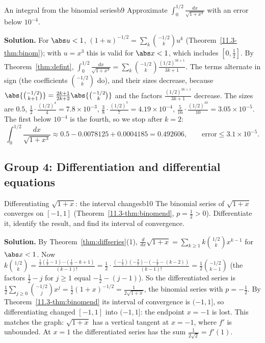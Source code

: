 \documentclass[11pt]{article}
\begin{document}
\begin{exmp}{An integral from the binomial series}{b9}
Approximate $\displaystyle\int_0^{1/2}\frac{dx}{\sqrt{1+x^3}}$ with an error below $10^{-4}$.

\textbf{Solution.} For $\abs u<1$, $(1+u)^{-1/2}=\sum_k\binom{-1/2}ku^k$ (Theorem~\ref{11.3-thm:binom}); with $u=x^3$ this is valid for $\abs x<1$, which includes $[0,\frac12]$. By Theorem~\ref{thm:defint}, $\int_0^{1/2}\frac{dx}{\sqrt{1+x^3}}=\sum_k\binom{-1/2}k\frac{(1/2)^{3k+1}}{3k+1}$. The terms alternate in sign (the coefficients $\binom{-1/2}k$ do), and their sizes decrease, because $\abs{\binom{-1/2}{k+1}}=\frac{2k+1}{2k+2}\abs{\binom{-1/2}k}$ and the factors $\frac{(1/2)^{3k+1}}{3k+1}$ decrease. The sizes are $0.5$, $\frac12\cdot\frac{(1/2)^4}4=7.8\times10^{-3}$, $\frac38\cdot\frac{(1/2)^7}7=4.19\times10^{-4}$, $\frac5{16}\cdot\frac{(1/2)^{10}}{10}=3.05\times10^{-5}$. The first below $10^{-4}$ is the fourth, so we stop after $k=2$:
\[
\int_0^{1/2}\frac{dx}{\sqrt{1+x^3}}\approx0.5-0.0078125+0.0004185=0.492606,\qquad\text{error}\le3.1\times10^{-5}.
\]
\end{exmp}

\subsection*{Group 4: Differentiation and differential equations}

\begin{exmp}{Differentiating $\sqrt{1+x}$: the interval changes}{b10}
The binomial series of $\sqrt{1+x}$ converges on $[-1,1]$ (Theorem~\ref{11.3-thm:binomend}, $p=\frac12>0$). Differentiate it, identify the result, and find its interval of convergence.

\textbf{Solution.} By Theorem~\ref{thm:diffseries}(1), $\frac d{dx}\sqrt{1+x}=\sum_{k\ge1}k\binom{1/2}kx^{k-1}$ for $\abs x<1$. Now $k\binom{1/2}k=\frac{\frac12(\frac12-1)\cdots(\frac12-k+1)}{(k-1)!}=\frac12\cdot\frac{(-\frac12)(-\frac32)\cdots(-\frac12-(k-2))}{(k-1)!}=\frac12\binom{-1/2}{k-1}$ (the factors $\frac12-j$ for $j\ge1$ equal $-\frac12-(j-1)$). So the differentiated series is $\frac12\sum_{j\ge0}\binom{-1/2}jx^j=\frac12(1+x)^{-1/2}=\frac1{2\sqrt{1+x}}$, the binomial series with $p=-\frac12$. By Theorem~\ref{11.3-thm:binomend} its interval of convergence is $(-1,1]$, so differentiating changed $[-1,1]$ into $(-1,1]$: the endpoint $x=-1$ is lost. This matches the graph: $\sqrt{1+x}$ has a vertical tangent at $x=-1$, where $f'$ is unbounded. At $x=1$ the differentiated series has the sum $\frac1{2\sqrt2}=f'(1)$.
\end{exmp}
\end{document}
